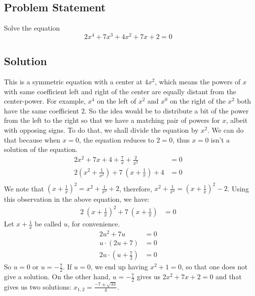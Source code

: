 \documentclass[12pt]{article}
\begin{document}
\subsection*{Problem Statement}
Solve the equation
\[
	2x^4 + 7x^3 + 4x^2 + 7x + 2 = 0
\]

\subsection{Solution}
This is a symmetric equation with a center at $4x^2$, which means the powers of $x$ with same coefficient left and right of the center are equally distant from the center-power. For example, $x^4$ on the left of $x^2$ and $x^0$ on the right of the $x^2$ both have the same coefficient 2. So the idea would be to distribute a bit of the power from the left to the right so that we have a matching pair of powers for $x$, albeit with opposing signs. To do that, we shall divide the equation by $x^2$. We can do that because when $x=0$, the equation reduces to $2 = 0$, thus $x = 0$ isn't a solution of the equation.
\begin{equation*}
	\begin{aligned}
		2x^2 + 7x + 4 + \frac{7}{x} + \frac{2}{x^2} &= 0\\
		2\left( x^2 + \frac{1}{x^2} \right) + 7\ \left( x + \frac{1}{x} \right) + 4 &= 0\\
	\end{aligned}
\end{equation*}
We note that $\left( x + \frac{1}{x} \right)^2 = x^2 + \frac{1}{x^2} + 2$, therefore, $x^2 + \frac{1}{x^2} = \left(x + \frac{1}{x}\right)^2-2$. Using this observation in the above equation, we have:
\begin{equation*}
	\begin{aligned}
		2\ \left(x + \frac{1}{x}\right)^2 + 7\ \left(x + \frac{1}{x}\right) &= 0
	\end{aligned}
\end{equation*}
Let $x + \frac{1}{x}$ be called $u$, for convenience.
\begin{equation*}
	\begin{aligned}
		2u^2 + 7u &= 0\\
		u \cdot (2u+7) &= 0\\
		2u \cdot \left(u+\frac{7}{2}\right) &= 0
	\end{aligned}
\end{equation*}
So $u = 0$ or $u = -\frac{7}{2}$. If $u = 0$, we end up having $x^2+1 = 0$, so that one does not give a solution. On the other hand, $u = -\frac{7}{2}$ gives us $2x^2 + 7x + 2 = 0$ and that gives us two solutions: $x_{1,2} = \frac{-7 \pm \sqrt{33}}{4}$.
\end{document}
